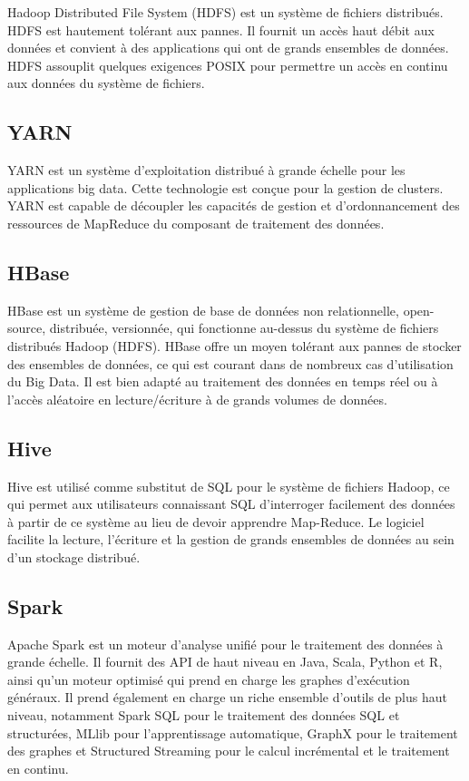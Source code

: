 \documentclass[12pt, french]{report}
\begin{document}
Hadoop Distributed File System (HDFS) est un système de fichiers distribués. HDFS est hautement tolérant aux pannes. Il fournit un accès haut débit aux données et convient à des applications qui ont de grands ensembles de données. HDFS assouplit quelques exigences POSIX pour permettre un accès en continu aux données du système de fichiers.

\subsection{YARN}

YARN est un système d'exploitation distribué à grande échelle pour les applications big data. Cette technologie est conçue pour la gestion de clusters. YARN est capable de découpler les capacités de gestion et d'ordonnancement des ressources de MapReduce du composant de traitement des données.

\subsection{HBase}

HBase est un système de gestion de base de données non relationnelle, open-source, distribuée, versionnée, qui fonctionne au-dessus du système de fichiers distribués Hadoop (HDFS). HBase offre un moyen tolérant aux pannes de stocker des ensembles de données, ce qui est courant dans de nombreux cas d'utilisation du Big Data. Il est bien adapté au traitement des données en temps réel ou à l'accès aléatoire en lecture/écriture à de grands volumes de données.

\subsection{Hive}

Hive est utilisé comme substitut de SQL pour le système de fichiers Hadoop, ce qui permet aux utilisateurs connaissant SQL d'interroger facilement des données à partir de ce système au lieu de devoir apprendre Map-Reduce. Le logiciel facilite la lecture, l'écriture et la gestion de grands ensembles de données au sein d'un stockage distribué.

\subsection{Spark}

Apache Spark est un moteur d'analyse unifié pour le traitement des données à grande échelle. Il fournit des API de haut niveau en Java, Scala, Python et R, ainsi qu'un moteur optimisé qui prend en charge les graphes d'exécution généraux. Il prend également en charge un riche ensemble d'outils de plus haut niveau, notamment Spark SQL pour le traitement des données SQL et structurées, MLlib pour l'apprentissage automatique, GraphX pour le traitement des graphes et Structured Streaming pour le calcul incrémental et le traitement en continu.
\end{document}

